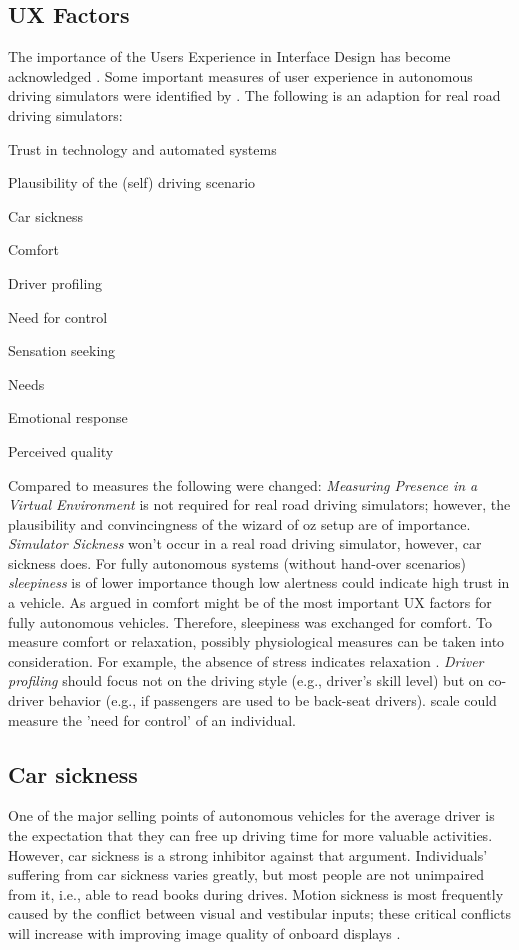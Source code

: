 \subsection{UX Factors}
\label{ssec:UXfactors}
The importance of the Users Experience in Interface Design has become acknowledged \citep{Soegaard2013TheEd.}. Some important measures of user experience in autonomous driving simulators were identified by \cite{Ive}. The following is an adaption for real road driving simulators: 

\begin{itemize*} 
  \item Trust in technology and automated systems\quad
  \item Plausibility of the (self) driving scenario\quad
  \item Car sickness\quad
  \item Comfort\quad
  \item Driver profiling\quad
  \item Need for control\quad
  \item Sensation seeking\quad
  \item Needs\quad
  \item Emotional response\quad
  \item Perceived quality\quad
\end{itemize*}

Compared to \cite{Ive} measures the following were changed: \emph{Measuring Presence in a Virtual Environment} is not required for real road driving simulators; however, the plausibility and convincingness of the wizard of oz setup are of importance. \emph{Simulator Sickness} won't occur in a real road driving simulator, however, car sickness does. For fully autonomous systems (without hand-over scenarios) \emph{sleepiness} is of lower importance though low alertness could indicate high trust in a vehicle. As argued in \emph{} comfort might be of the most important UX factors for fully autonomous vehicles. Therefore, sleepiness was exchanged for comfort. To measure comfort or relaxation, possibly physiological measures can be taken into consideration. For example, the absence of stress indicates relaxation \citep{Salai2016}. \emph{Driver profiling} should focus not on the driving style (e.g., driver’s skill level) but on co-driver behavior (e.g., if passengers are used to be back-seat drivers). \cite{Burger1979TheControl} scale could measure the 'need for control' of an individual.

\subsection{Car sickness}
\label{ssec:carsickness}
One of the major selling points of autonomous vehicles for the average driver is the expectation that they can free up driving time for more valuable activities. However, car sickness is a strong inhibitor against that argument. Individuals' suffering from car sickness varies greatly, but most people are not unimpaired from it, i.e., able to read books during drives. Motion sickness is most frequently caused by the conflict between visual and vestibular inputs; these critical conflicts will increase with improving image quality of onboard displays \citep{Diels2016}.

